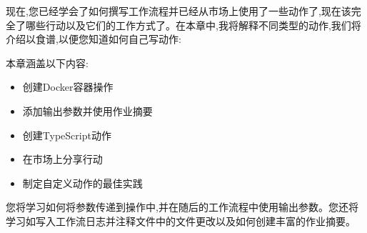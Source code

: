 现在,您已经学会了如何撰写工作流程并已经从市场上使用了一些动作了,现在该完全了哪些行动以及它们的工作方式了。在本章中,我将解释不同类型的动作,我们将介绍以食谱,以便您知道如何自己写动作:

本章涵盖以下内容:

\begin{itemize}
\item 
创建Docker容器操作

\item 
添加输出参数并使用作业摘要

\item 
创建TypeScript动作

\item 
在市场上分享行动

\item 
制定自定义动作的最佳实践
\end{itemize}

您将学习如何将参数传递到操作中,并在随后的工作流程中使用输出参数。您还将学习如写入工作流日志并注释文件中的文件更改以及如何创建丰富的作业摘要。
